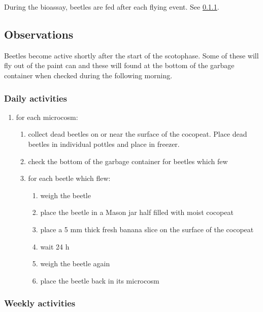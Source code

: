 \documentclass[twocolumn, 12pt,letterpaper,english,bibliography=totocnumbered, abstract=on]{scrartcl}
\begin{document}
During the bioassay, beetles are fed after each flying event. See \ref{daily activities}. 

\subsection{Observations}

Beetles become active shortly after the start of the scotophase. Some of these will fly out of the paint can and these will found at the bottom of the garbage container when checked during the following morning.

\subsubsection{Daily activities}
\label{daily activities}

\begin{enumerate}
	\item for each microcosm:
	\begin{enumerate}
        \item collect dead beetles on or near the surface of the cocopeat. Place dead beetles in individual pottles and place in freezer.
        \item check the bottom of the garbage container for beetles which few	
        \item for each beetle which flew:
        \begin{enumerate}
            \item weigh the beetle
            \item place the beetle in a Mason jar half filled with moist cocopeat
            \item place a 5 mm thick fresh banana slice on the surface of the cocopeat
            \item wait 24 h
            \item weigh the beetle again
            \item place the beetle back in its microcosm
        \end{enumerate}
    \end{enumerate}	   
\end{enumerate}

\subsubsection{Weekly activities}
\end{document}
